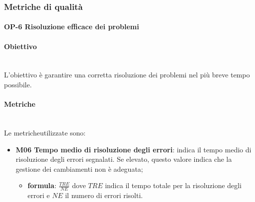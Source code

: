 \subsubsection{Metriche di qualità}
	\paragraph{OP-6 Risoluzione efficace dei problemi}
	\paragraph*{Obiettivo}\mbox{}\\ [1mm]
	L'obiettivo è garantire una corretta risoluzione dei problemi nel più breve tempo possibile.
	\paragraph*{Metriche}\mbox{}\\ [1mm]
	Le metriche\glosp utilizzate sono:
	\begin{itemize}
		\item \textbf{M06 Tempo medio di risoluzione degli errori}: indica il tempo medio di risoluzione degli errori segnalati. Se elevato, questo valore indica che la gestione dei cambiamenti non è adeguata;
		\begin{itemize}
			\item[] \textbf{formula}: $\frac{TRE}{NE}$ dove $TRE$ indica il tempo totale per la risoluzione degli errori e $NE$ il numero di errori risolti.
		\end{itemize} 
	\end{itemize}		
